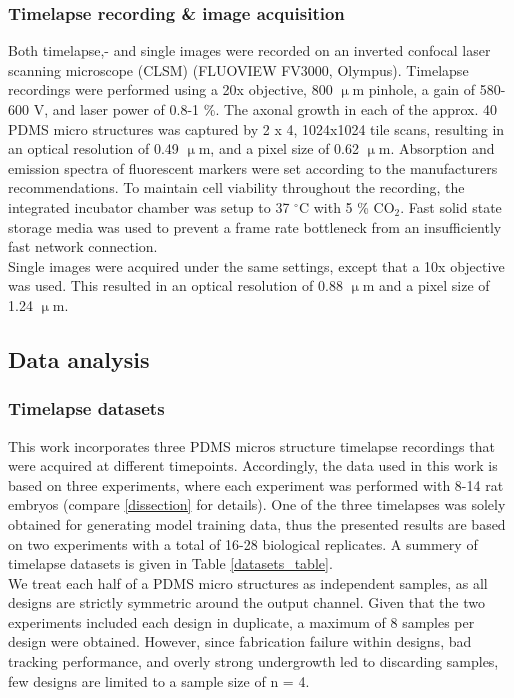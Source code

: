 \subsubsection{Timelapse recording \& image acquisition}
Both timelapse,- and single images were recorded on an inverted confocal laser
scanning microscope (CLSM) (FLUOVIEW FV3000, Olympus). Timelapse recordings were
performed using a 20x objective, 800 $\upmu$m pinhole, a gain of 580-600 V, and
laser power of 0.8-1 \%. The axonal growth in each of the approx. 40 PDMS micro
structures was captured by 2 x 4, 1024x1024 tile scans, resulting in an optical
resolution of 0.49 $\upmu$m, and a pixel size of 0.62 $\upmu$m. Absorption and
emission spectra of fluorescent markers were set according to the manufacturers
recommendations. To maintain cell viability throughout the recording, the
integrated incubator chamber was setup to 37 $^{\circ}$C with 5 \% CO$_{2}$.
Fast solid state storage media was used to prevent a frame rate bottleneck from
an insufficiently fast network connection. \\

Single images were acquired under the same settings, except that a 10x objective
was used. This resulted in an optical resolution of 0.88 $\upmu$m and a pixel
size of 1.24 $\upmu$m. 

\subsection{Data analysis}
\subsubsection{Timelapse datasets}
This work incorporates three PDMS micros structure timelapse recordings that
were acquired at different timepoints. Accordingly, the data used in this work
is based on three experiments, where each experiment was performed with 8-14 rat
embryos (compare \ref{dissection} for details). One of the three timelapses was
solely obtained for generating model training data, thus the presented results
are based on two experiments with a total of 16-28 biological replicates. A
summery of timelapse datasets is given in Table \ref{datasets_table}. \\

We treat each half of a PDMS micro structures as independent samples, as all
designs are strictly symmetric around the output channel. Given that the two
experiments included each design in duplicate, a maximum of 8 samples per design
were obtained. However, since fabrication failure within designs, bad tracking
performance, and overly strong undergrowth led to discarding samples, few
designs are limited to a sample size of n = 4.

